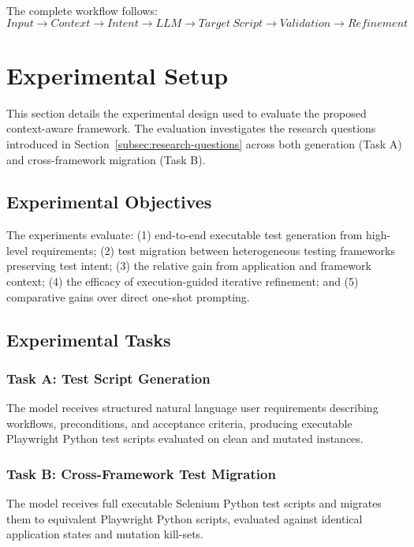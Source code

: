 \documentclass[pdflatex,sn-mathphys-num]{sn-jnl}
\begin{document}
The complete workflow follows:
\begin{equation}
Input \rightarrow Context \rightarrow Intent \rightarrow LLM \rightarrow Target\ Script \rightarrow Validation \rightarrow Refinement
\label{eq:overall-workflow}
\end{equation}


\section{Experimental Setup}
\label{sec:experimental-setup}

This section details the experimental design used to evaluate the proposed
context-aware framework. The evaluation investigates the research questions
introduced in Section~\ref{subsec:research-questions} across both generation
(Task A) and cross-framework migration (Task B).

\subsection{Experimental Objectives}
\label{subsec:experimental-objectives}

The experiments evaluate:
(1) end-to-end executable test generation from high-level requirements;
(2) test migration between heterogeneous testing frameworks preserving test intent;
(3) the relative gain from application and framework context;
(4) the efficacy of execution-guided iterative refinement; and
(5) comparative gains over direct one-shot prompting.

\subsection{Experimental Tasks}
\label{subsec:experimental-tasks}

\subsubsection{Task A: Test Script Generation}
The model receives structured natural language user requirements describing
workflows, preconditions, and acceptance criteria, producing executable
Playwright Python test scripts evaluated on clean and mutated instances.

\subsubsection{Task B: Cross-Framework Test Migration}
The model receives full executable Selenium Python test scripts and migrates
them to equivalent Playwright Python scripts, evaluated against identical
application states and mutation kill-sets.
\end{document}

